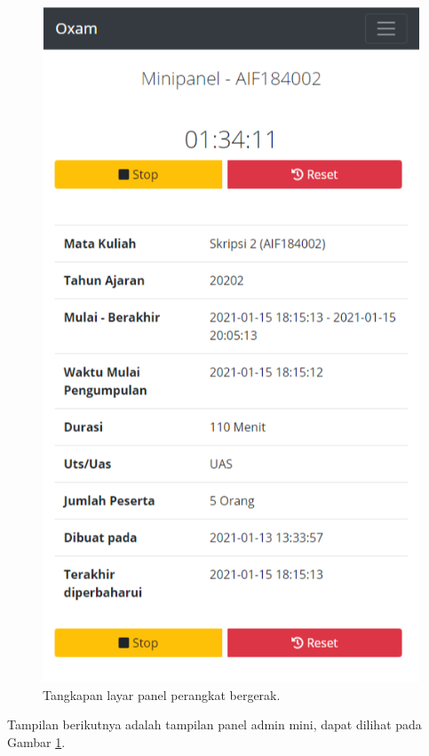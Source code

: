     \begin{figure}
        \centering
        \includegraphics[width=0.3\paperwidth]{Gambar/implemented-interface/admin/ujian-minipanel.png}
        \caption{Tangkapan layar panel perangkat bergerak.}
        \label{fig:screenshot-admin-exam-minipanel}
    \end{figure}
    Tampilan berikutnya adalah tampilan panel admin mini, dapat dilihat pada Gambar
    \ref{fig:screenshot-admin-exam-minipanel}.
    
